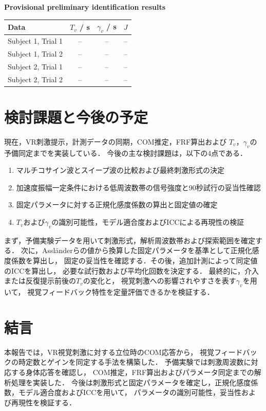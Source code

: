 \documentclass[a4paper,9pt,twocolumn]{ltjsarticle}
\begin{document}
\begin{center}
\begin{minipage}{0.9\columnwidth}
  \centering
  \textbf{Provisional preliminary identification results}\\[2pt]
  \footnotesize
  \setlength{\tabcolsep}{4pt}
  \begin{tabular}{@{}lccc@{}}
    \hline
    Data & $T_v$ / s & $\gamma_v$ / s & $J$ \\
    \hline
    Subject 1, Trial 1 & -- & -- & -- \\
    Subject 1, Trial 2 & -- & -- & -- \\
    Subject 2, Trial 1 & -- & -- & -- \\
    Subject 2, Trial 2 & -- & -- & -- \\
    \hline
  \end{tabular}
\end{minipage}
\end{center}

\section{検討課題と今後の予定}

現在，VR刺激提示，計測データの同期，COM推定，FRF算出および
$T_v$，$\gamma_v$の予備同定までを実装している．
今後の主な検討課題は，以下の4点である．

\begin{enumerate}
  \item マルチコサイン波とスイープ波の比較および最終刺激形式の決定
  \item 加速度振幅一定条件における低周波数帯の信号強度と90秒試行の妥当性確認
  \item 固定パラメータに対する正規化感度係数の算出と固定値の確定
  \item $T_v$および$\gamma_v$の識別可能性，モデル適合度およびICCによる再現性の検証
\end{enumerate}

まず，予備実験データを用いて刺激形式，解析周波数帯および探索範囲を確定する．
次に，Assl\"anderらの値から換算した固定パラメータを基準として正規化感度係数を算出し，
固定の妥当性を確認する．その後，追加計測によって同定値のICCを算出し，
必要な試行数および平均化回数を決定する．
最終的に，介入または反復提示前後の$T_v$の変化と，
視覚刺激への影響されやすさを表す$\gamma_v$を用いて，
視覚フィードバック特性を定量評価できるかを検証する．

\section{結言}

本報告では，VR視覚刺激に対する立位時のCOM応答から，
視覚フィードバックの時定数とゲインを同定する手法を構築した．
予備実験では刺激周波数に対応する身体応答を確認し，
COM推定，FRF算出およびパラメータ同定までの解析処理を実装した．
今後は刺激形式と固定パラメータを確定し，正規化感度係数，モデル適合度およびICCを用いて，
パラメータの識別可能性，妥当性および再現性を検証する．



\end{document}
